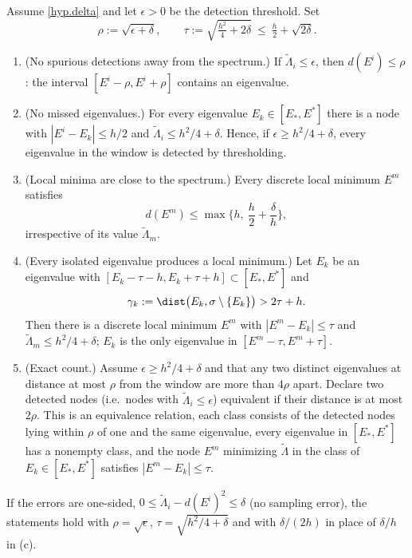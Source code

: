 \begin{proposition}\label{prop.stability}
Assume \eqref{hyp.delta} and let $\epsilon>0$ be the detection threshold. Set
\[
\rho:=\sqrt{\epsilon+\delta},\qquad \tau:=\sqrt{\tfrac{h^2}{4}+2\delta}\ \le\ \tfrac h2+\sqrt{2\delta}.
\]
\begin{enumerate}
\item[(a)] (No spurious detections away from the spectrum.) If
$\tilde\Lambda_i\le\epsilon$, then $d(E^i)\le\rho$: the interval $[E^i-\rho,E^i+\rho]$
contains an eigenvalue.
\item[(b)] (No missed eigenvalues.) For every eigenvalue $E_k\in[E_*,E^*]$ there is a node
with $|E^i-E_k|\le h/2$ and $\tilde\Lambda_i\le h^2/4+\delta$. Hence, if
$\epsilon\ge h^2/4+\delta$, every eigenvalue in the window is detected by thresholding.
\item[(c)] (Local minima are close to the spectrum.) Every discrete local minimum $E^m$
satisfies
\[
d(E^m)\le\max\Big\{h,\ \frac h2+\frac\delta h\Big\},
\]
irrespective of its value $\tilde\Lambda_m$.
\item[(d)] (Every isolated eigenvalue produces a local minimum.) Let $E_k$ be an
eigenvalue with $[E_k-\tau-h,E_k+\tau+h]\subset[E_*,E^*]$ and
\begin{equation}\label{gap.cond}
\gamma_k:=\dist\big(E_k,\sigma\setminus\{E_k\}\big)>2\tau+h .
\end{equation}
Then there is a discrete local minimum $E^m$ with $|E^m-E_k|\le\tau$ and
$\tilde\Lambda_m\le h^2/4+\delta$; $E_k$ is the only eigenvalue in
$[E^m-\tau,E^m+\tau]$.
\item[(e)] (Exact count.) Assume $\epsilon\ge h^2/4+\delta$ and that any two distinct
eigenvalues at distance at most $\rho$ from the window are more than $4\rho$ apart.
Declare two detected nodes (i.e.\ nodes with $\tilde\Lambda_i\le\epsilon$) equivalent if
their distance is at most $2\rho$. This is an equivalence relation, each class consists of
the detected nodes lying within $\rho$ of one and the same eigenvalue, every eigenvalue
in $[E_*,E^*]$ has a nonempty class, and the node $E^{m}$ minimizing $\tilde\Lambda$ in
the class of $E_k\in[E_*,E^*]$ satisfies $|E^m-E_k|\le\tau$.
\end{enumerate}
If the errors are one-sided, $0\le\tilde\Lambda_i-d(E^i)^2\le\delta$ (no sampling error),
the statements hold with $\rho=\sqrt\epsilon$, $\tau=\sqrt{h^2/4+\delta}$ and with
$\delta/(2h)$ in place of $\delta/h$ in (c).
\end{proposition}

